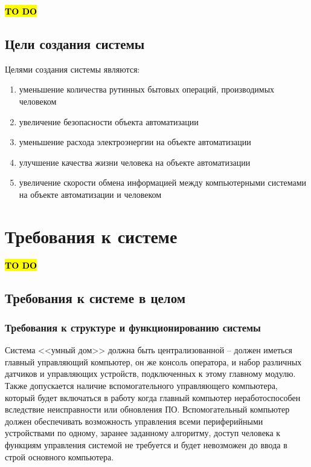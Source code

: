\documentclass[a4paper, 12pt, titlepage]{article}
\begin{document}
\hl{\bf TO DO}
\subsection{Цели создания системы}

Целями создания системы являются:
\begin{enumerate}
\item уменьшение количества рутинных бытовых операций, производимых человеком
\item увеличение безопасности объекта автоматизации
\item уменьшение расхода электроэнергии на объекте автоматизации
\item улучшение качества жизни человека на объекте автоматизации
\item увеличение скорости обмена информацией между компьютерными системами 
на объекте автоматизации и человеком
\end{enumerate}


\section{Требования к системе}

\hl{\bf TO DO}
\subsection{Требования к системе в целом}

\subsubsection{Требования к структуре и функционированию системы}

Система <<умный дом>> должна быть централизованной -- должен иметься главный управляющий 
компьютер, он же консоль оператора, и набор различных датчиков и управляющих устройств, 
подключенных к этому главному модулю. Также допускается наличие вспомогательного управляющего 
компьютера, который будет включаться в работу когда главный компьютер неработоспособен вследствие 
неисправности или обновления ПО. Вспомогательный компьютер должен обеспечивать возможность управления 
всеми периферийными устройствами по одному, заранее заданному алгоритму, доступ человека к функциям управления 
системой не требуется и будет невозможен до ввода в строй основного компьютера.
\end{document}
